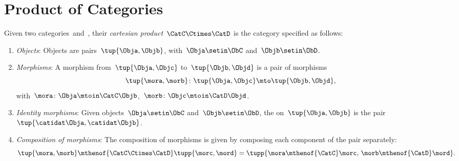 
\section{Product of Categories}

\begin{ctdefinition}
    \label{def:cartesian-product-category}
    Given two categories~\CatC and~\CatD, their \emph{cartesian product}~$\CatC \Ctimes \CatD$ is the category specified as follows:
    \begin{enumerate}
        \item \emph{Objects}: Objects are pairs~$\tup{\Obja,\Objb}$, with~$\Obja\setin \ObC$ and~$\Objb\setin \ObD$.
        \item \emph{Morphisms}: A morphism from~$\tup{\Obja, \Objc}$ to~$\tup{\Objb,\Objd}$ is a pair of morphisms
              \begin{equation}
                  \tup{\mora,\morb} \colon \tup{\Obja,\Objc}\mto \tup{\Objb,\Objd},
              \end{equation}
              with~$\mora\colon \Obja \mtoin\CatC \Objb$,~$\morb\colon \Objc\mtoin\CatD \Objd$.
        \item \emph{Identity morphisms}: Given objects~$\Obja\setin \ObC$ and~$\Objb\setin \ObD$, the  on~$\tup{\Obja,\Objb}$ is the pair $\tup{\catidat\Obja,\catidat\Objb}$.
        \item \emph{Composition of morphisms}: The composition of morphisms is given by composing each component of the pair separately:
              \begin{equation}
                  \tup{\mora,\morb}\mthenof{\CatC\Ctimes\CatD} \tupp{\morc,\mord}=\tupp{\mora\mthenof{\CatC}\morc,\, \morb \mthenof{\CatD} \mord}.
              \end{equation}
    \end{enumerate}
\end{ctdefinition}
